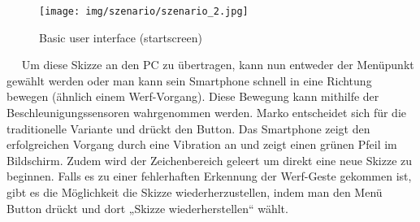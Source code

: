 \documentclass{chi-ext}
\begin{document}
\begin{figure}
  \centering
  \texttt{[image: img/szenario/szenario\_2.jpg]}
  \caption{Basic user interface (startscreen)}
  \label{fig:mockup_startscreen}
\end{figure}
 
 Um diese Skizze an den PC zu übertragen, kann nun entweder der Menüpunkt gewählt werden oder man kann sein Smartphone schnell in eine Richtung bewegen (ähnlich einem Werf-Vorgang). Diese Bewegung kann mithilfe der Beschleunigungssensoren wahrgenommen werden. Marko entscheidet sich für die traditionelle Variante und drückt den Button.
Das Smartphone zeigt den erfolgreichen Vorgang durch eine Vibration an und zeigt einen grünen Pfeil im Bildschirm. Zudem wird der Zeichenbereich geleert um direkt eine neue Skizze zu beginnen. Falls es zu einer fehlerhaften Erkennung der Werf-Geste gekommen ist, gibt es die Möglichkeit die Skizze wiederherzustellen, indem man den Menü Button drückt und dort „Skizze wiederherstellen“ wählt.
\end{document}
